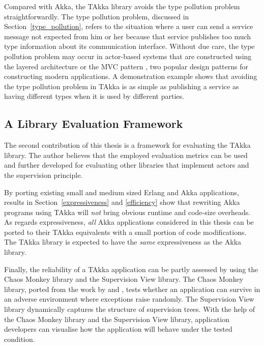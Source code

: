 Compared with Akka, the TAkka library avoids the type pollution 
problem straightforwardly.  The type pollution problem, discussed in 
Section~\ref{type_pollution}, refers to the situation where a user can send a 
service message not expected from him or her because that service publishes too 
much type information about its communication interface. Without due care, 
the type pollution problem may occur in actor-based systems that are 
constructed using the layered architecture \citep{DijkstraTHE, 
buschmann2007pattern} or the MVC pattern \citep{reenskaug1979original, 
reenskaug2003model}, two popular design patterns for constructing modern 
applications.  A demonstration example shows that avoiding the type 
pollution problem in TAkka is as simple as publishing a service as having 
different types when it is used by different parties.

\subsection{A Library Evaluation Framework}

The second contribution of this thesis is a framework for evaluating the 
TAkka library.  The author believes that the employed evaluation metrics can be 
used and further developed for evaluating other libraries that implement actors 
and the supervision principle.

By porting existing small and medium sized Erlang and Akka applications, 
results in Section~\ref{expressiveness} and \ref{efficiency} show that 
rewriting Akka programs using TAkka will {\it not} bring obvious runtime and 
code-size overheads. As regards expressiveness, {\it all} Akka applications 
considered in this thesis can be ported to their TAkka equivalents with a small 
portion of code modifications.  The TAkka library is expected to have the {\it 
same} expressiveness as the Akka library.

Finally, the reliability of a TAkka application can be partly assessed by using
the Chaos Monkey library and the Supervision View library.  
The Chaos Monkey library, ported from the work by \citet{ChaosMonkey} and 
\citet{ErlangChaosMonkey}, tests whether an application can survive in an 
adverse environment where exceptions raise randomly.  The Supervision View 
library dynamically captures the structure of supervision trees.  With the help 
of the Chaos Monkey library and the Supervision View library, application 
developers can visualise how the application will behave under the tested 
condition.

